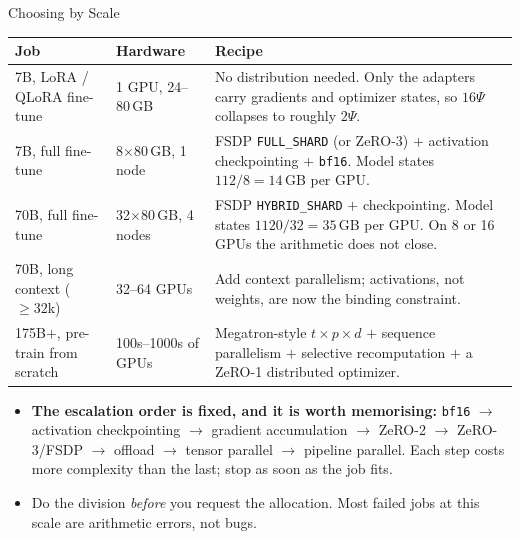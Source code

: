 \begin{frame}{Choosing by Scale}
  \centering
  \scriptsize
  \begin{tabular}{@{}p{2.9cm}p{2.0cm}p{6.4cm}@{}}
    \toprule
    \textbf{Job} & \textbf{Hardware} & \textbf{Recipe} \\
    \midrule
    7B, LoRA / QLoRA fine-tune & 1 GPU, 24--80\,GB &
      No distribution needed. Only the adapters carry gradients and optimizer states, so $16\Psi$ collapses to roughly $2\Psi$. \\
    \addlinespace[0.25em]
    7B, full fine-tune & 8$\times$80\,GB, 1 node &
      FSDP \texttt{FULL\_SHARD} (or ZeRO-3) $+$ activation checkpointing $+$ \texttt{bf16}. Model states $112/8 = 14$\,GB per GPU. \\
    \addlinespace[0.25em]
    70B, full fine-tune & 32$\times$80\,GB, 4 nodes &
      FSDP \texttt{HYBRID\_SHARD} $+$ checkpointing. Model states $1120/32 = 35$\,GB per GPU. On 8 or 16 GPUs the arithmetic does not close. \\
    \addlinespace[0.25em]
    70B, long context ($\geq 32$k) & 32--64 GPUs &
      Add context parallelism; activations, not weights, are now the binding constraint. \\
    \addlinespace[0.25em]
    175B$+$, pre-train from scratch & 100s--1000s of GPUs &
      Megatron-style $t \times p \times d$ $+$ sequence parallelism $+$ selective recomputation $+$ a ZeRO-1 distributed optimizer. \\
    \bottomrule
  \end{tabular}
  \vspace{0.21em}
  \begin{itemize}\scriptsize\itemsep0.05em
    \item[\textcolor{red}{$\blacktriangleright$}] \textbf{The escalation order is fixed, and it is worth memorising:} \texttt{bf16} $\rightarrow$ activation checkpointing $\rightarrow$ gradient accumulation $\rightarrow$ ZeRO-2 $\rightarrow$ ZeRO-3/FSDP $\rightarrow$ offload $\rightarrow$ tensor parallel $\rightarrow$ pipeline parallel. Each step costs more complexity than the last; stop as soon as the job fits.
    \item[\textcolor{red}{$\blacktriangleright$}] Do the division \emph{before} you request the allocation. Most failed jobs at this scale are arithmetic errors, not bugs.
  \end{itemize}
\end{frame}
